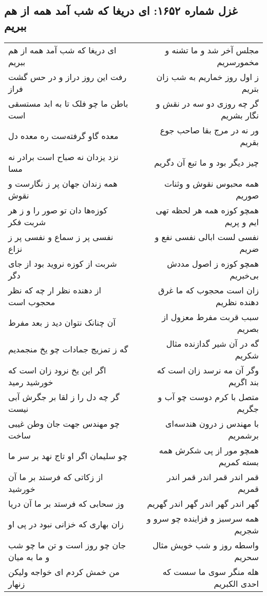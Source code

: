 \begin{center}
\section*{غزل شماره ۱۶۵۲: ای دریغا که شب آمد همه از هم ببریم}
\label{sec:1652}
\begin{longtable}{l p{0.5cm} r}
ای دریغا که شب آمد همه از هم ببریم
&&
مجلس آخر شد و ما تشنه و مخمورسریم
\\
رفت این روز دراز و در حس گشت فراز
&&
ز اول روز خماریم به شب زان بتریم
\\
باطن ما چو فلک تا به ابد مستسقی است
&&
گر چه روزی دو سه در نقش و نگار بشریم
\\
معده گاو گرفته‌ست ره معده دل
&&
ور نه در مرج بقا صاحب جوع بقریم
\\
نزد یزدان نه صباح است برادر نه مسا
&&
چیز دیگر بود و ما تبع آن دگریم
\\
همه زندان جهان پر ز نگارست و نقوش
&&
همه محبوس نقوش و وثنات صوریم
\\
کوزه‌ها دان تو صور را و ز هر شربت فکر
&&
همچو کوزه همه هر لحظه تهی ایم و پریم
\\
نفسی پر ز سماع و نفسی پر ز نزاع
&&
نفسی لست ابالی نفسی نفع و ضریم
\\
شربت از کوزه نروید بود از جای دگر
&&
همچو کوزه ز اصول مددش بی‌خبریم
\\
از دهنده نظر ار چه که نظر محجوب است
&&
زان است محجوب که ما غرق دهنده نظریم
\\
آن چنانک نتوان دید ز بعد مفرط
&&
سبب قربت مفرط معزول از بصریم
\\
گه ز تمزیج جمادات چو یخ منجمدیم
&&
گه در آن شیر گدازنده مثال شکریم
\\
اگر این یخ نرود زان است که خورشید رمید
&&
وگر آن مه نرسد زان است که بند اگریم
\\
گر چه دل را ز لقا بر جگرش آبی نیست
&&
متصل با کرم دوست چو آب و جگریم
\\
چو مهندس جهت جان وطن غیبی ساخت
&&
با مهندس ز درون هندسه‌ای برشمریم
\\
چو سلیمان اگر او تاج نهد بر سر ما
&&
همچو مور از پی شکرش همه بسته کمریم
\\
از زکاتی که فرستد بر ما آن خورشید
&&
قمر اندر قمر اندر قمر اندر قمریم
\\
وز سحابی که فرستد بر ما آن دریا
&&
گهر اندر گهر اندر گهر اندر گهریم
\\
زان بهاری که خزانی نبود در پی او
&&
همه سرسبز و فزاینده چو سرو و شجریم
\\
جان چو روز است و تن ما چو شب و ما به میان
&&
واسطه روز و شب خویش مثال سحریم
\\
من خمش کردم ای خواجه ولیکن زنهار
&&
هله منگر سوی ما سست که احدی الکبریم
\\
\end{longtable}
\end{center}
